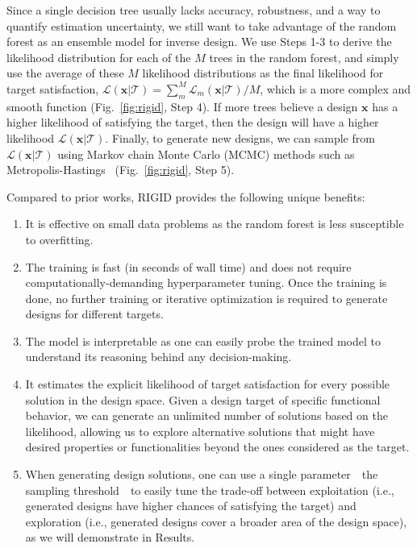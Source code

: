 \documentclass{article}
\begin{document}
Since a single decision tree usually lacks accuracy, robustness, and a way to quantify estimation uncertainty, we still want to take advantage of the random forest as an ensemble model for inverse design. We use Steps 1-3 to derive the likelihood distribution for each of the $M$ trees in the random forest, and simply use the average of these $M$ likelihood distributions as the final likelihood for target satisfaction, $\mathcal{L}(\mathbf{x}|\mathcal{T})=\sum_m^M \mathcal{L}_m(\mathbf{x}|\mathcal{T})/M$, which is a more complex and smooth function (Fig.~\ref{fig:rigid}, Step 4). If more trees believe a design $\mathbf{x}$ has a higher likelihood of satisfying the target, then the design will have a higher likelihood $\mathcal{L}(\mathbf{x}|\mathcal{T})$. Finally, to generate new designs, we can sample from $\mathcal{L}(\mathbf{x}|\mathcal{T})$ using Markov chain Monte Carlo (MCMC) methods such as Metropolis-Hastings~\cite{hastings1970monte} (Fig.~\ref{fig:rigid}, Step 5).

Compared to prior works, RIGID provides the following unique benefits:
\begin{enumerate}
    \item It is effective on small data problems as the random forest is less susceptible to overfitting.
    \item The training is fast (in seconds of wall time) and does not require computationally-demanding hyperparameter tuning. Once the training is done, no further training or iterative optimization is required to generate designs for different targets.
    \item The model is interpretable as one can easily probe the trained model to understand its reasoning behind any decision-making.
    \item It estimates the explicit likelihood of target satisfaction for every possible solution in the design space. Given a design target of specific functional behavior, we can generate an unlimited number of solutions based on the likelihood, allowing us to explore alternative solutions that might have desired properties or functionalities beyond the ones considered as the target. 
    \item When generating design solutions, one can use a single parameter~\textemdash~the sampling threshold~\textemdash~to easily tune the trade-off between exploitation (i.e., generated designs have higher chances of satisfying the target) and exploration (i.e., generated designs cover a broader area of the design space), as we will demonstrate in Results.
\end{enumerate}
\end{document}
